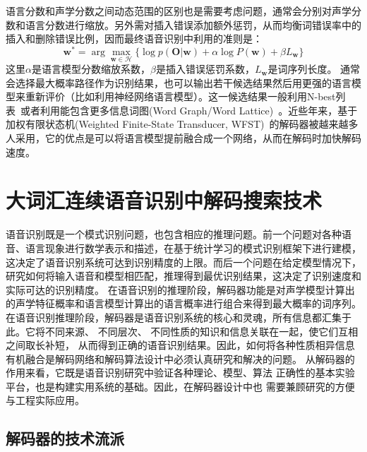 语言分数和声学分数之间动态范围的区别也是需要考虑问题，通常会分别对声学分数和语言分数进行缩放。另外需对插入错误添加额外惩罚，从而均衡词错误率中的插入和删除错误比例，因而最终语音识别中利用的准则是：
\begin{equation}
\mathbf{w}^* = \arg \max_{\mathbf{w} \in \mathcal{H}} \{\log p(\mathbf{O}|\mathbf{w}) + \alpha \log P(\mathbf{w}) + \beta L_{\mathbf{w}}\}
\end{equation}
这里$\alpha$是语言模型分数缩放系数，$\beta$是插入错误惩罚系数，$L_{\mathbf{w}}$是词序列长度。
通常会选择最大概率路径作为识别结果，也可以输出若干候选结果然后用更强的语言模型来重新评价（比如利用神经网络语言模型）。这一候选结果一般利用N-best列表~\cite{schwartz1990n}或者利用能包含更多信息词图(Word Graph/Word Lattice)~\cite{ortmanns1997word}。近些年来，基于加权有限状态机(Weighted Finite-State Transducer, WFST)~\cite{mohri2002weighted}的解码器被越来越多人采用，它的优点是可以将语言模型提前融合成一个网络，从而在解码时加快解码速度。




\section{大词汇连续语音识别中解码搜索技术}
\label{chap:intro-lvcsr}

语音识别既是一个模式识别问题，也包含相应的推理问题。前一个问题对各种语音、语言现象进行数学表示和描述，在基于统计学习的模式识别框架下进行建模，这决定了语音识别系统可达到识别精度的上限。而后一个问题在给定模型情况下，研究如何将输入语音和模型相匹配，推理得到最优识别结果，这决定了识别速度和实际可达的识别精度。
%
在语音识别的推理阶段，解码器功能是对声学模型计算出的声学特征概率和语言模型计算出的语言概率进行组合来得到最大概率的词序列。
%
在语音识别推理阶段，解码器是语音识别系统的核心和灵魂，所有信息都汇集于此。它将不同来源、 不同层次、 不同性质的知识和信息关联在一起，使它们互相之间取长补短， 从而得到正确的语音识别结果。因此，如何将各种性质相异信息有机融合是解码网络和解码算法设计中必须认真研究和解决的问题。
从解码器的作用来看，它既是语音识别研究中验证各种理论、模型、算法
正确性的基本实验平台，也是构建实用系统的基础。因此，在解码器设计中也
需要兼顾研究的方便与工程实际应用。

\subsection{解码器的技术流派}
\label{chap:intro-lvcsr-decmethod}

